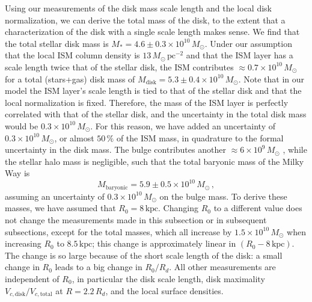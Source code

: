 \documentclass{emulateapj}
\newcommand{\kpc}{\ensuremath{\,\mathrm{kpc}}}
\newcommand{\pc}{\ensuremath{\,\mathrm{pc}}}
\begin{document}
Using our measurements of the disk mass scale length and the local
disk normalization, we can derive the total mass of the disk, to the
extent that a characterization of the disk with a single scale length
makes sense. We find that the total stellar disk mass is $M_{*} =
4.6\pm0.3\times10^{10}\,M_\odot$. Under our assumption that the local
ISM column density is $13\,M_\odot\pc^{-2}$ and that the ISM layer has
a scale length twice that of the stellar disk, the ISM contributes
$\approx0.7\times10^{10}\,M_\odot$ for a total (stars+gas) disk mass
of $M_{\mathrm{disk}} = 5.3\pm0.4\times10^{10}\,M_\odot$. Note that in
our model the ISM layer's scale length is tied to that of the stellar
disk and that the local normalization is fixed. Therefore, the mass of
the ISM layer is perfectly correlated with that of the stellar disk,
and the uncertainty in the total disk mass would be
$0.3\times10^{10}\,M_\odot$. For this reason, we have added an
uncertainty of $0.3\times10^{10}\,M_\odot$, or almost $50\,\%$ of the
ISM mass, in quadrature to the formal uncertainty in the disk
mass. The bulge contributes another $\approx6\times10^{9}\,M_\odot$
\citep{binneytremaine}, while the stellar halo mass is negligible,
such that the total baryonic mass of the Milky Way is
\begin{equation}
  M_{\mathrm{baryonic}} = 5.9\pm0.5\times10^{10}\,M_\odot\,,
\end{equation}
assuming an uncertainty of $0.3\times10^{10}\,M_\odot$ on the bulge
mass. To derive these masses, we have assumed that $R_0 =
8\kpc$. Changing $R_0$ to a different value does not change the
measurements made in this subsection or in subsequent subsections,
except for the total masses, which all increase by
$1.5\times10^{10}\,M_\odot$ when increasing $R_0$ to $8.5\kpc$; this
change is approximately linear in $(R_0 - 8\kpc)$. The change is so
large because of the short scale length of the disk: a small change in
$R_0$ leads to a big change in $R_0/R_d$. All other measurements are
independent of $R_0$, in particular the disk scale length, disk
maximality $V_{c,\mathrm{disk}} / V_{c,\mathrm{total}}$ at $R =
2.2\,R_d$, and the local surface densities.
\end{document}
